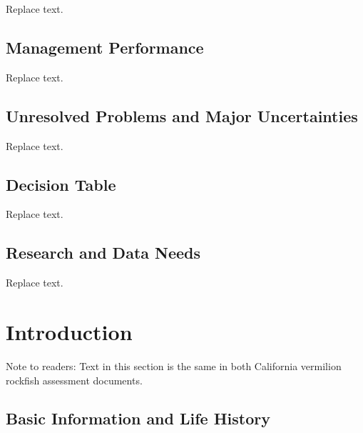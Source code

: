 \documentclass[
  english,
  a4paper,
]{article}
\begin{document}
Replace text.

\hypertarget{management-performance}{%
\subsection*{Management Performance}\label{management-performance}}

Replace text.

\hypertarget{unresolved-problems-and-major-uncertainties}{%
\subsection*{Unresolved Problems and Major Uncertainties}\label{unresolved-problems-and-major-uncertainties}}

Replace text.

\hypertarget{decision-table}{%
\subsection*{Decision Table}\label{decision-table}}

Replace text.

\hypertarget{research-and-data-needs}{%
\subsection*{Research and Data Needs}\label{research-and-data-needs}}

Replace text.

\pagebreak
\setlength{\parskip}{5mm plus1mm minus1mm}
\setcounter{page}{1}
\renewcommand{\thefigure}{\arabic{figure}}
\renewcommand{\thetable}{\arabic{table}}
\setcounter{table}{0}
\setcounter{figure}{0}

\hypertarget{introduction}{%
\section{Introduction}\label{introduction}}

Note to readers: Text in this section is the same in both California vermilion rockfish assessment
documents.

\hypertarget{basic-information-and-life-history}{%
\subsection{Basic Information and Life History}\label{basic-information-and-life-history}}
\end{document}
